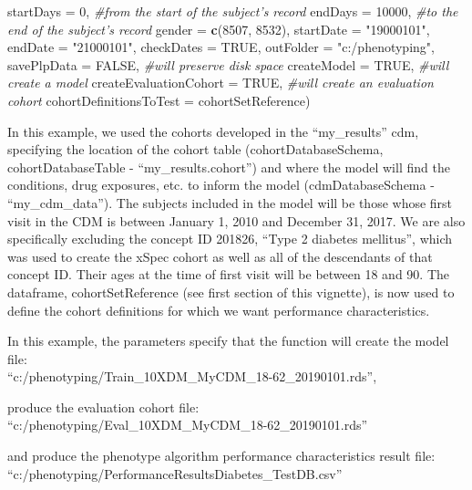 \documentclass[
]{article}
\newenvironment{Shaded}{\begin{snugshade}}{\end{snugshade}}
\newcommand{\CommentTok}[1]{\textcolor[rgb]{0.56,0.35,0.01}{\textit{#1}}}
\newcommand{\DataTypeTok}[1]{\textcolor[rgb]{0.13,0.29,0.53}{#1}}
\newcommand{\DecValTok}[1]{\textcolor[rgb]{0.00,0.00,0.81}{#1}}
\newcommand{\KeywordTok}[1]{\textcolor[rgb]{0.13,0.29,0.53}{\textbf{#1}}}
\newcommand{\NormalTok}[1]{#1}
\newcommand{\OtherTok}[1]{\textcolor[rgb]{0.56,0.35,0.01}{#1}}
\newcommand{\StringTok}[1]{\textcolor[rgb]{0.31,0.60,0.02}{#1}}
\begin{document}
\begin{Shaded}
\begin{Highlighting}[]
                \DataTypeTok{startDays =} \DecValTok{0}\NormalTok{, }\CommentTok{#from the start of the subject's record}
                \DataTypeTok{endDays =} \DecValTok{10000}\NormalTok{, }\CommentTok{#to the end of the subject's record}
                \DataTypeTok{gender =} \KeywordTok{c}\NormalTok{(}\DecValTok{8507}\NormalTok{, }\DecValTok{8532}\NormalTok{),}
                \DataTypeTok{startDate =} \StringTok{"19000101"}\NormalTok{,}
                \DataTypeTok{endDate =} \StringTok{"21000101"}\NormalTok{,}
                \DataTypeTok{checkDates =} \OtherTok{TRUE}\NormalTok{,}
                \DataTypeTok{outFolder =} \StringTok{"c:/phenotyping"}\NormalTok{,}
                \DataTypeTok{savePlpData =} \OtherTok{FALSE}\NormalTok{, }\CommentTok{#will preserve disk space}
                \DataTypeTok{createModel =} \OtherTok{TRUE}\NormalTok{, }\CommentTok{#will create a model}
                \DataTypeTok{createEvaluationCohort =} \OtherTok{TRUE}\NormalTok{, }\CommentTok{#will create an evaluation cohort}
                \DataTypeTok{cohortDefinitionsToTest =}\NormalTok{ cohortSetReference)}
\end{Highlighting}
\end{Shaded}

In this example, we used the cohorts developed in the ``my\_results''
cdm, specifying the location of the cohort table (cohortDatabaseSchema,
cohortDatabaseTable - ``my\_results.cohort'') and where the model will
find the conditions, drug exposures, etc. to inform the model
(cdmDatabaseSchema - ``my\_cdm\_data''). The subjects included in the
model will be those whose first visit in the CDM is between January 1,
2010 and December 31, 2017. We are also specifically excluding the
concept ID 201826, ``Type 2 diabetes mellitus'', which was used to
create the xSpec cohort as well as all of the descendants of that
concept ID. Their ages at the time of first visit will be between 18 and
90. The dataframe, cohortSetReference (see first section of this
vignette), is now used to define the cohort definitions for which we
want performance characteristics.

In this example, the parameters specify that the function will create
the model file:\\
``c:/phenotyping/Train\_10XDM\_MyCDM\_18-62\_20190101.rds'',

produce the evaluation cohort file:\\
``c:/phenotyping/Eval\_10XDM\_MyCDM\_18-62\_20190101.rds''

and produce the phenotype algorithm performance characteristics result
file:\\
``c:/phenotyping/PerformanceResultsDiabetes\_TestDB.csv''
\end{document}
